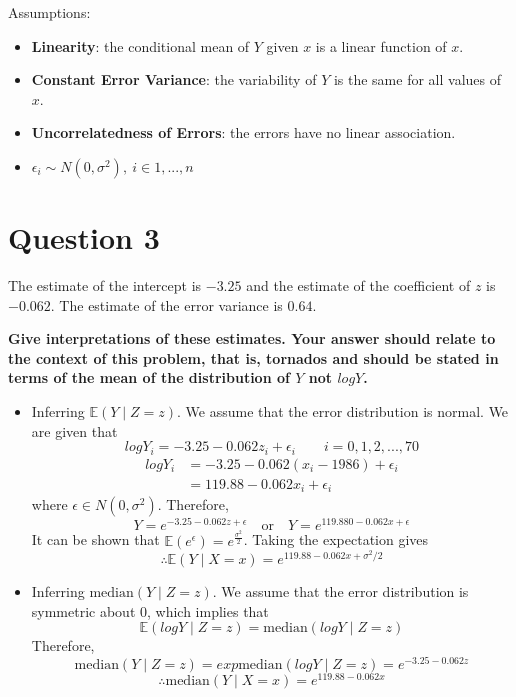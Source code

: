 \documentclass[
]{book}
\providecommand{\tightlist}{%
  \setlength{\itemsep}{0pt}\setlength{\parskip}{0pt}}
\begin{document}
Assumptions:

\begin{itemize}
\tightlist
\item
  \textbf{Linearity}: the conditional mean of \(Y\) given \(x\) is a linear function of \(x\).
\item
  \textbf{Constant Error Variance}: the variability of \(Y\) is the same for all values of \(x\).
\item
  \textbf{Uncorrelatedness of Errors}: the errors have no linear association.
\item
  \(\epsilon_i \sim N(0, \sigma^2), \ i \in 1, ..., n\)
\end{itemize}

\section{Question 3}\label{question-3-4}

The estimate of the intercept is \(-3.25\) and the estimate of the coefficient of \(z\) is \(-0.062\). The estimate of the error variance is \(0.64\).

\textbf{Give interpretations of these estimates. Your answer should relate to the context of this problem, that is, tornados and should be stated in terms of the mean of the distribution of \(Y\) not \(log Y\).}\\

\begin{itemize}
\item
  Inferring \(\mathbb{E}(Y \mid Z = z)\). We assume that the error distribution is normal.
  We are given that
  \[log Y_i = -3.25 - 0.062z_i + \epsilon_i \qquad i = 0, 1, 2, ..., 70\]
  \[
  \begin{aligned}
  log Y_i &= -3.25 - 0.062(x_i -1986) + \epsilon_i \\
        &= 119.88 - 0.062x_i + \epsilon_i
  \end{aligned}
  \]
  where \(\epsilon \in N(0, \sigma^2)\). Therefore,
  \[Y = e^{-3.25-0.062z + \epsilon} \quad \text{or} \quad Y = e^{119.880-0.062x + \epsilon}\]
  It can be shown that \(\mathbb{E}(e^{\epsilon}) = e^{\frac{\sigma^2}{2}}\). Taking the expectation gives
  \[\therefore \mathbb{E}(Y \mid X = x) = e^{119.88 - 0.062x + \sigma^2/2}\]
\item
  Inferring \(\text{median}(Y \mid Z = z)\). We assume that the error distribution is symmetric about 0, which implies that
  \[\mathbb{E}(log Y \mid Z = z) = \text{median}(log Y \mid Z = z)\]
  Therefore,
  \[\text{median}(Y \mid Z = z) = exp{\text{median}(log Y \mid Z = z)} = e^{-3.25-0.062z}\]
  \[\therefore \text{median}(Y \mid X = x) = e^{119.88 - 0.062x}\]
\end{itemize}
\end{document}
